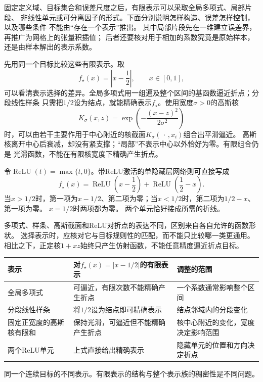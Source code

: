 固定定义域、目标集合和误差尺度之后，有限表示可以采取全局多项式、局部片段、
非线性单元或可分离因子的形式。下面分别说明怎样构造、误差怎样控制，以及哪些条件
不能由“存在一个表示”推出。
其中局部片段先在一维建立误差界，再推广为网格上的张量积插值；
后者还要核对用于相加的系数究竟是原始样本，还是由样本解出的表示系数。

先用同一个目标比较这些有限表示。取
\[
  f_\star(x)=\left|x-\frac12\right|,
  \qquad x\in[0,1],
\]
可以看清表示选择的差异。全局多项式用一组遍及整个区间的基函数逼近折点；分段线性样条
只需把$1/2$设为结点，就能精确表示$f_\star$。使用宽度$\sigma>0$的高斯核
\[
  K_\sigma(x,z)
  =
  \exp\left(-\frac{(x-z)^2}{2\sigma^2}\right)
\]
时，可以由若干主要作用于中心附近的核截面$K_\sigma(\,\cdot\,,x_i)$组合出平滑逼近。
高斯核离开中心后衰减，却没有紧支撑；“局部”不表示中心以外恰好为零。有限组合仍是
光滑函数，不能在有限核宽度下精确产生折点。

令$\operatorname{ReLU}(t)=\max\{t,0\}$。带ReLU激活的单隐藏层网络则可直接写成
\[
  f_\star(x)
  =
  \operatorname{ReLU}\left(x-\frac12\right)
  +
  \operatorname{ReLU}\left(\frac12-x\right).
\]
当$x>1/2$时，第一项为$x-1/2$、第二项为零；当$x<1/2$时，第二项为$1/2-x$、第一项为零。
$x=1/2$时两项都为零。
两个单元恰好接成所需的折线。

多项式、样条、高斯截面和ReLU对折点的表达不同，区别来自各自允许的函数形状。
选择表示时，应核对它与目标规则性的匹配，而不能只比较哪一类更通用。
相比之下，正定核$1+xz$始终只产生仿射函数，不能任意精度逼近折点目标。

\begin{fullwidth}
\begin{minipage}{\linewidth}
 \centering\small
 \begin{tabularx}{\linewidth}{@{}lXX@{}}
 \toprule
 表示 & 对$f_\star(x)=|x-1/2|$的有限表示 & 调整的范围\\
 \midrule
 全局多项式 & 可逼近，有限次数不能精确产生折点 & 一个系数通常影响整个区间\\
 分段线性样条 & 将$1/2$设为结点即可精确表示 & 结点邻域内的分段变化\\
 固定正宽度的高斯核有限和 & 保持光滑，可逼近但不能精确产生折点 & 核中心附近的变化，宽度决定影响范围\\
 两个ReLU单元 & 上式直接给出精确表示 & 隐藏单元的位置和方向决定折点\\
 \bottomrule
 \end{tabularx}
   {同一个连续目标的不同表示。有限表示的结构与整个表示族的稠密性是不同问题。}
\end{minipage}
\end{fullwidth}


